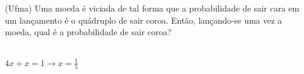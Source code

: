 \begin{ex}
(Ufma) Uma moeda é viciada de tal forma que a probabilidade de sair cara em um lançamento é o quádruplo de sair coroa. 
Então, lançando-se uma vez a moeda, qual é a probabilidade de sair coroa? 
 \begin{sol}
  \phantom{A} \\
  $4x+x=1 \rightarrow x=\frac{1}{5}$
 \end{sol}

\end{ex}